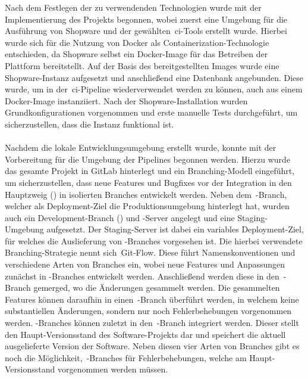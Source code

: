 Nach dem Festlegen der zu verwendenden Technologien wurde mit der Implementierung des Projekts begonnen, wobei
zuerst eine Umgebung für die Ausführung von Shopware und der gewählten\ \acrshort{ci}-Tools erstellt wurde.
Hierbei wurde sich für die Nutzung von Docker als Containerization-Technologie entschieden, da Shopware selbst ein
Docker-Image für das Betreiben der Plattform bereitstellt.
Auf der Basis des bereitgestellten Images wurde eine Shopware-Instanz aufgesetzt und anschließend eine Datenbank
angebunden.
Diese wurde, um in der\ \acrshort{ci}-Pipeline wiederverwendet werden zu können, auch aus einem Docker-Image
instanziiert.
Nach der Shopware-Installation wurden Grundkonfigurationen vorgenommen und erste manuelle Tests durchgeführt, um
sicherzustellen, dass die Instanz funktional ist.
\\\\
Nachdem die lokale Entwicklungsumgebung erstellt wurde, konnte mit der Vorbereitung für die Umgebung der Pipelines
begonnen werden.
Hierzu wurde das gesamte Projekt in GitLab hinterlegt und ein Branching-Modell eingeführt, um sicherzustellen, dass
neue Features und Bugfixes vor der Integration in den Hauptzweig () in isolierten Branches entwickelt
werden.
Neben dem\ -Branch, welcher als Deployment-Ziel die Produktionsumgebung hinterlegt hat, wurden auch
ein Development-Branch () und -Server angelegt und eine Staging-Umgebung aufgesetzt.
Der Staging-Server ist dabei ein variables Deployment-Ziel, für welches die Auslieferung von
-Branches vorgesehen ist.
Die hierbei verwendete Branching-Strategie nennt sich\ \glqq Git-Flow\grqq.
Diese führt Namenskonventionen und verschiedene Arten von Branches ein, wobei neue Features und Anpassungen zunächst in
-Branches entwickelt werden.
Anschließend werden diese in den\ -Branch gemerged, wo die Änderungen gesammelt werden.
Die gesammelten Features können daraufhin in einen\ -Branch überführt werden, in welchem keine
substantiellen Änderungen, sondern nur noch Fehlerbehebungen vorgenommen werden.
-Branches können zuletzt in den\ -Branch integriert werden.
Dieser stellt den Haupt-Versionsstand des Software-Projekts dar und speichert die aktuell ausgelieferte Version der
Software.
Neben diesen vier Arten von Branches gibt es noch die Möglichkeit,\ -Branches für Fehlerbehebungen,
welche am Haupt-Versionsstand vorgenommen werden müssen.

